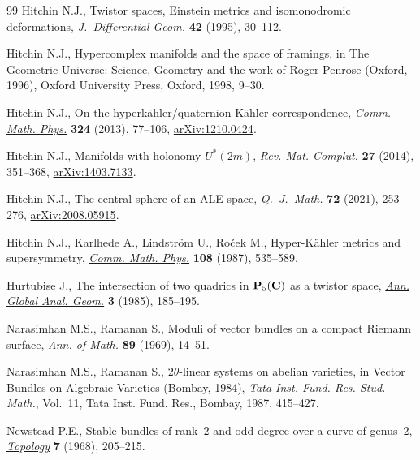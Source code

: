 \documentclass[pdftex]{sigma}
\numberwithin{equation}{section}
\begin{document}
\begin{thebibliography}{99}
Hitchin N.J., Twistor spaces, {E}instein metrics and isomonodromic
 deformations, \href{https://doi.org/10.4310/jdg/1214457032}{\textit{J.~Differential Geom.}} \textbf{42} (1995), 30--112.

Hitchin N.J., Hypercomplex manifolds and the space of framings, in The
 Geometric Universe: Science, Geometry and the work of Roger Penrose
 ({O}xford, 1996), Oxford University Press, Oxford, 1998, 9--30.

Hitchin N.J., On the hyperk\"ahler/quaternion {K}\"ahler correspondence,
 \href{https://doi.org/10.1007/s00220-013-1689-y}{\textit{Comm. Math. Phys.}} \textbf{324} (2013), 77--106, \href{https://arxiv.org/abs/1210.0424}{arXiv:1210.0424}.

Hitchin N.J., Manifolds with holonomy {$U^*(2m)$}, \href{https://doi.org/10.1007/s13163-014-0150-x}{\textit{Rev. Mat. Complut.}}
 \textbf{27} (2014), 351--368, \href{https://arxiv.org/abs/1403.7133}{arXiv:1403.7133}.

Hitchin N.J., The central sphere of an {ALE} space, \href{https://doi.org/10.1093/qmath/haaa051}{\textit{Q.~J.~Math.}}
 \textbf{72} (2021), 253--276, \href{https://arxiv.org/abs/2008.05915}{arXiv:2008.05915}.

Hitchin N.J., Karlhede A., Lindstr\"om U., Ro\v{c}ek M., Hyper-{K}\"ahler
 metrics and supersymmetry, \href{https://doi.org/10.1007/BF01214418}{\textit{Comm. Math. Phys.}} \textbf{108} (1987),
 535--589.

Hurtubise J., The intersection of two quadrics in {${\bf P}_5({\bf C})$} as a
 twistor space, \href{https://doi.org/10.1007/BF01000339}{\textit{Ann. Global Anal. Geom.}} \textbf{3} (1985), 185--195.

Narasimhan M.S., Ramanan S., Moduli of vector bundles on a compact {R}iemann
 surface, \href{https://doi.org/10.2307/1970807}{\textit{Ann. of Math.}} \textbf{89} (1969), 14--51.

Narasimhan M.S., Ramanan S., {$2\theta$}-linear systems on abelian varieties,
 in Vector Bundles on Algebraic Varieties ({B}ombay, 1984), \textit{Tata Inst.
 Fund. Res. Stud. Math.}, Vol.~11, Tata Inst. Fund. Res., Bombay, 1987,
 415--427.

Newstead P.E., Stable bundles of rank~{$2$} and odd degree over a curve of
 genus~{$2$}, \href{https://doi.org/10.1016/0040-9383(68)90001-3}{\textit{Topology}} \textbf{7} (1968), 205--215.


\end{thebibliography}
\end{document}
